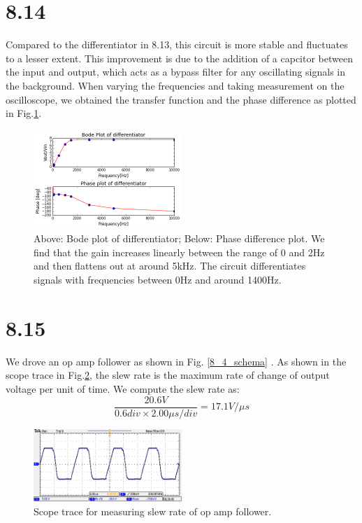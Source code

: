 \documentclass[authoryear, 12pt,5p, times]{elsarticle}
\begin{document}
  \section*{8.14}
Compared to the differentiator in 8.13, this circuit is more stable and fluctuates to a lesser extent. This improvement is due to the addition of a capcitor between the input and output, which acts as a bypass filter for any oscillating signals in the background. When varying the frequencies and taking measurement on the oscilloscope, we obtained the transfer function and the phase difference as plotted in Fig.\ref{8_14_plot}.
 \begin{figure}[h!]
 \centering
  \includegraphics[width=0.5\textwidth]{figure/8_14_plot.png} 
\caption{Above: Bode plot of differentiator; Below: Phase difference plot. We find that the gain increases linearly between the range of 0 and 2Hz and then flattens out at around 5kHz. The circuit differentiates signals with frequencies between 0Hz and around 1400Hz.}
\label{8_14_plot}
 \end{figure}
 \section*{8.15}
We drove an op amp follower as shown in Fig. \ref{8_4_schema} . As shown in the scope trace in Fig.\ref{scope}, the slew rate is the maximum rate of change of output voltage per unit of time. We compute the slew rate as: 
\begin{equation}
 \frac{20.6V}{0.6 div \times 2.00 \mu s /div}
= 17.1 V/\mu s
\end{equation} 
 \begin{figure}[h!]
 \centering
  \includegraphics[width=0.5\textwidth]{figure/TEK00000.png} 
\caption{Scope trace for measuring slew rate of op amp follower.}
\label{scope}
 \end{figure}
\end{document}
